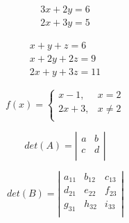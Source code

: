 \documentclass[a4paper, 12pt]{article}
\begin{document}
\vspace{0.5cm}


\begin{eqnarray}
	3x + 2y = 6 \\
	2x + 3y = 5 
\end{eqnarray}

\vspace{0.5cm}

\begin{eqnarray}
	x + y + z = 6 \\
	x + 2y + 2z = 9 \\
	2x + y + 3z = 11
\end{eqnarray}

\vspace{0.5cm}

\begin{equation}
f(x) =
\left\lbrace
\begin{array}{cc}
	x - 1,& x = 2\\
	2x + 3,& x \neq 2\\
\end{array}
\right.
\end{equation}

\vspace{0.5cm}

\begin{equation}
det(A) =
\left\vert
\begin{array}{lr}
	a & b \\
	c & d \\
\end{array}
\right\vert
\end{equation}

\vspace{0.5cm}

\begin{equation}
det(B) =
\left\vert
\begin{array}{lcr}
	a_{11} & b_{12} & c_{13} \\
	d_{21} & e_{22} & f_{23} \\
	g_{31} & h_{32} & i_{33} \\
\end{array}
\right\vert
\end{equation}

\vspace{0.5cm}
\end{document}
